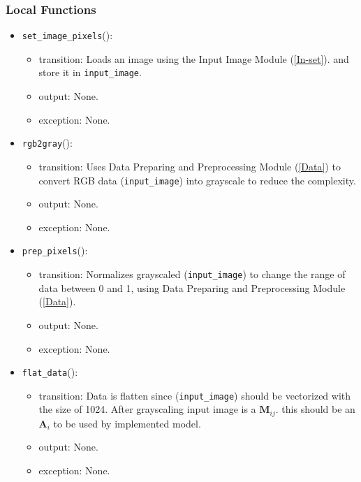 \documentclass[12pt, titlepage]{article}
\def\code#1{\texttt{#1}}
\begin{document}
\subsubsection{Local Functions}
\begin{itemize}
  \item \code{set\_image\_pixels}():
  \begin{itemize}
    \item transition: Loads an image using the Input Image Module (\ref{In-set}).
    and store it in \code{input\_image}.
    \item output: None.
    \item exception: None.
  \end{itemize}

  \item \code{rgb2gray}():
  \begin{itemize}
    \item transition: Uses Data Preparing and Preprocessing Module (\ref{Data}) to convert 
    RGB data (\code{input\_image}) into grayscale to reduce the complexity. 
    \item output: None.
    \item exception: None.
  \end{itemize}
  \item \code{prep\_pixels}():
  \begin{itemize}
    \item transition: Normalizes grayscaled (\code{input\_image}) to change the range of data between 0 and 1, 
    using Data Preparing and Preprocessing Module (\ref{Data}).
    \item output: None.
    \item exception: None.
  \end{itemize}
  \item \code{flat\_data}():
  \begin{itemize}
    \item transition: Data is flatten since (\code{input\_image}) should be vectorized 
    with the size of 1024. 
    After grayscaling input image is a $\mathbf{M}_{ij}$. this should be an $\mathbf{A}_{i}$ to be used by implemented model.
    \item output: None.
    \item exception: None.
  \end{itemize}

\end{itemize}

\newpage
\end{document}

